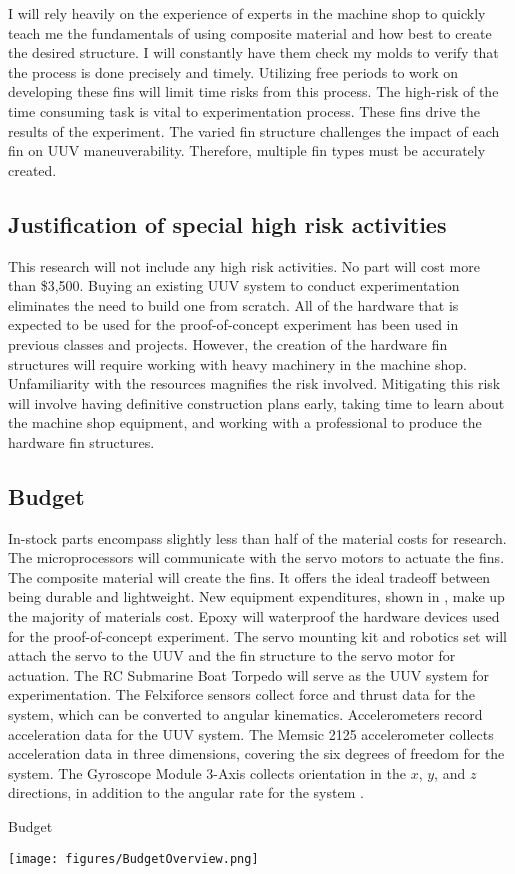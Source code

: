 \documentclass[]{IEEEtran}
\begin{document}
I will rely heavily on the experience of experts in the machine shop to quickly teach me the fundamentals of using composite material and how best to create the desired structure.  I will constantly have them check my molds to verify that the process is done precisely and timely.  Utilizing free periods to work on developing these fins will limit time risks from this process.  The high-risk of the time consuming task is vital to experimentation process.  These fins drive the results of the experiment.  The varied fin structure challenges the impact of each fin on UUV maneuverability.  Therefore, multiple fin types must be accurately created.

\subsection{Justification of special high risk activities}
This research will not include any high risk activities.  No part will cost more than \$3,500.  Buying an existing UUV system to conduct experimentation eliminates the need to build one from scratch.  All of the hardware that is expected to be used for the proof-of-concept experiment has been used in previous classes and projects.  However, the creation of the hardware fin structures will require working with heavy machinery in the machine shop.  Unfamiliarity with the resources magnifies the risk involved.  Mitigating this risk will involve having definitive construction plans early, taking time to learn about the machine shop equipment, and working with a professional to produce the hardware fin structures.  

\subsection{Budget}
In-stock parts encompass slightly less than half of the material costs for research.  The microprocessors will communicate with the servo motors to actuate the fins.  The composite material will create the fins.  It offers the ideal tradeoff between being durable and lightweight.  New equipment expenditures, shown in , make up the majority of materials cost.  Epoxy will waterproof the hardware devices used for the proof-of-concept experiment.  The servo mounting kit and robotics set will attach the servo to the UUV and the fin structure to the servo motor for actuation.  The RC Submarine Boat Torpedo will serve as the UUV system for experimentation.  The Felxiforce sensors collect force and thrust data for the system, which can be converted to angular kinematics.  Accelerometers record acceleration data for the UUV system.  The Memsic 2125 accelerometer collects acceleration data in three dimensions, covering the six degrees of freedom for the system.  The Gyroscope Module 3-Axis collects orientation in the $x$, $y$, and $z$ directions, in addition to the angular rate for the system \cite{parallax2013}.    
\begin{table*}[p]
\caption{Budget}
\label{tab:2}
\begin{center}
\texttt{[image: figures/BudgetOverview.png]}
\end{center}
\end{table*}
\end{document}
